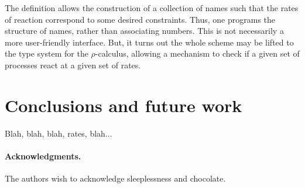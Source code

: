 \documentclass[]{amsart}
\theoremstyle{definition}
\theoremstyle{remark}
\numberwithin{equation}{subsection}
\newcommand{\rhoc}{$\rho$-calculus}
\begin{document}
The definition allows the construction of a collection of names such
that the rates of reaction correspond to some desired
constraints. Thus, one programs the structure of names, rather than
associating numbers. This is not necessarily a more user-friendly
interface. But, it turns out the whole scheme may be lifted to the
type system for the {\rhoc}, allowing a mechanism to check if a given
set of processes react at a given set of rates.

\section{Conclusions and future work}

Blah, blah, blah, rates, blah...

\paragraph{Acknowledgments.}
The authors wish to acknowledge sleeplessness and chocolate.





\end{document}
